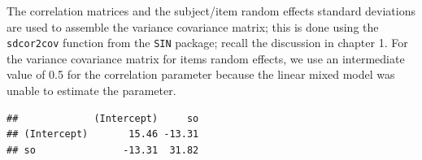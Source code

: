 \documentclass[12pt,]{krantz}
\newenvironment{Shaded}{\begin{snugshade}}{\end{snugshade}}
\newcommand{\CommentTok}[1]{\textcolor[rgb]{0.56,0.35,0.01}{\textit{#1}}}
\newcommand{\DataTypeTok}[1]{\textcolor[rgb]{0.13,0.29,0.53}{#1}}
\newcommand{\DecValTok}[1]{\textcolor[rgb]{0.00,0.00,0.81}{#1}}
\newcommand{\KeywordTok}[1]{\textcolor[rgb]{0.13,0.29,0.53}{\textbf{#1}}}
\newcommand{\NormalTok}[1]{#1}
\newcommand{\OperatorTok}[1]{\textcolor[rgb]{0.81,0.36,0.00}{\textbf{#1}}}
\newcommand{\StringTok}[1]{\textcolor[rgb]{0.31,0.60,0.02}{#1}}
\begin{document}
The correlation matrices and the subject/item random effects standard deviations are used to assemble the variance covariance matrix; this is done using the \texttt{sdcor2cov} function from the \texttt{SIN} package; recall the discussion in chapter 1. For the variance covariance matrix for items random effects, we use an intermediate value of 0.5 for the correlation parameter because the linear mixed model was unable to estimate the parameter.

\begin{Shaded}
\end{Shaded}

\begin{verbatim}
##             (Intercept)     so
## (Intercept)       15.46 -13.31
## so               -13.31  31.82
\end{verbatim}
\end{document}
